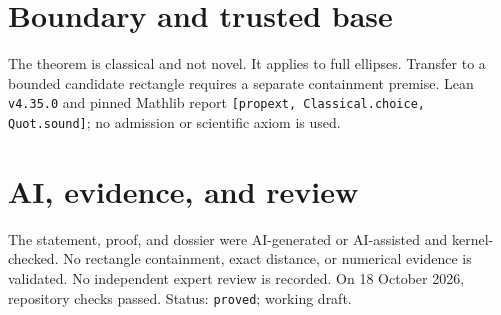\documentclass[11pt]{article}
\begin{document}
\section{Boundary and trusted base}
The theorem is classical and not novel. It applies to full ellipses. Transfer to a bounded
candidate rectangle requires a separate containment premise. Lean \texttt{v4.35.0} and
pinned Mathlib report \texttt{[propext, Classical.choice, Quot.sound]}; no admission or
scientific axiom is used.

\section{AI, evidence, and review}
The statement, proof, and dossier were AI-generated or AI-assisted and kernel-checked.
No rectangle containment, exact distance, or numerical evidence is validated. No
independent expert review is recorded. On 18 October 2026, repository checks passed.
Status: \texttt{proved}; working draft.
\end{document}
